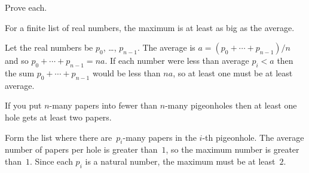 \documentclass{test}  %
\begin{document}
\begin{problem}
\end{problem}

\begin{problem}  Prove each.
\begin{exes}
\begin{exercise} 
  For a finite list of real numbers,
  the maximum is at least as big as the average.
\end{exercise}
\begin{answer}
  Let the real numbers be $p_0$, \ldots, $p_{n-1}$.
  The average is $a=(p_0+\cdots+p_{n-1})/n$ and so 
  $p_0+\cdots+p_{n-1}=na$.
  If each number were less than average $p_i<a$ then the sum
  $p_0+\cdots+p_{n-1}$ would be less than $na$, so at least
  one must be at least average.  
\end{answer}
\begin{exercise} If you put $n$-many papers into fewer than $n$-many
  pigeonholes then at least one hole gets at least two papers.
\end{exercise}
\begin{answer}
  Form the list where there are~$p_i$-many papers in the $i$-th pigeonhole.
  The average number of papers per hole is greater than~$1$, 
  so the maximum number is greater than~$1$.
  Since each $p_i$ is a natural number, the maximum must be at least~$2$.  
\end{answer}
\end{exes}

\end{problem}
\end{document}
